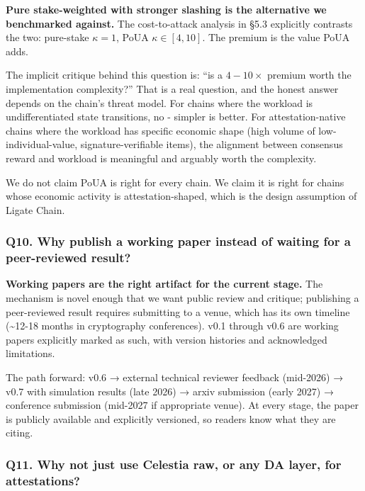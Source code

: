 \documentclass[
  11pt,
]{article}
\begin{document}
\textbf{Pure stake-weighted with stronger slashing is the alternative we
benchmarked against.} The cost-to-attack analysis in §5.3 explicitly
contrasts the two: pure-stake \(\kappa = 1\), PoUA
\(\kappa \in [4, 10]\). The premium is the value PoUA adds.

The implicit critique behind this question is: ``is a \(4-10\times\)
premium worth the implementation complexity?'' That is a real question,
and the honest answer depends on the chain's threat model. For chains
where the workload is undifferentiated state transitions, no - simpler
is better. For attestation-native chains where the workload has specific
economic shape (high volume of low-individual-value,
signature-verifiable items), the alignment between consensus reward and
workload is meaningful and arguably worth the complexity.

We do not claim PoUA is right for every chain. We claim it is right for
chains whose economic activity is attestation-shaped, which is the
design assumption of Ligate Chain.

\subsubsection{Q10. Why publish a working paper instead of waiting for a
peer-reviewed
result?}\label{q10.-why-publish-a-working-paper-instead-of-waiting-for-a-peer-reviewed-result}

\textbf{Working papers are the right artifact for the current stage.}
The mechanism is novel enough that we want public review and critique;
publishing a peer-reviewed result requires submitting to a venue, which
has its own timeline (\textasciitilde12-18 months in cryptography
conferences). v0.1 through v0.6 are working papers explicitly marked as
such, with version histories and acknowledged limitations.

The path forward: v0.6 → external technical reviewer feedback (mid-2026)
→ v0.7 with simulation results (late 2026) → arxiv submission (early
2027) → conference submission (mid-2027 if appropriate venue). At every
stage, the paper is publicly available and explicitly versioned, so
readers know what they are citing.

\subsubsection{Q11. Why not just use Celestia raw, or any DA layer, for
attestations?}\label{q11.-why-not-just-use-celestia-raw-or-any-da-layer-for-attestations}
\end{document}
